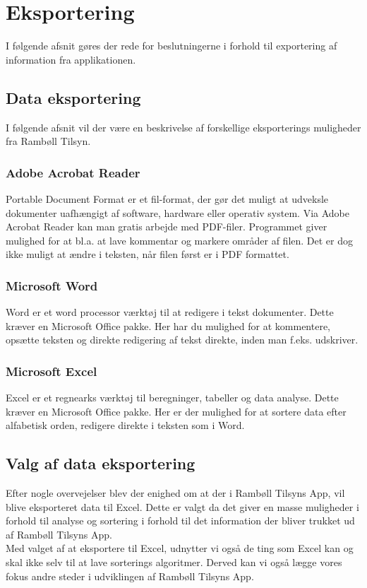 \section{Eksportering}                                   
I følgende afsnit gøres der rede for beslutningerne i forhold til exportering af information fra applikationen.

\subsection{Data eksportering}
I følgende afsnit vil der være en beskrivelse af forskellige eksporterings muligheder fra Rambøll Tilsyn.

\subsubsection{Adobe Acrobat Reader}
Portable Document Format\cite{PDF} er et fil-format, der gør det muligt at udveksle dokumenter uafhængigt af software, hardware eller operativ system.
Via Adobe Acrobat Reader\cite{AdobeReader} kan man gratis arbejde med PDF-filer. Programmet giver mulighed for at bl.a. at lave kommentar og markere områder af filen. Det er dog ikke muligt at ændre i teksten, når filen først er i PDF formattet.

\subsubsection{Microsoft Word}
Word\cite{Office} er et word processor\cite{WordProcessor} værktøj til at redigere i tekst dokumenter.
Dette kræver en Microsoft Office pakke. Her har du mulighed for at kommentere, opsætte teksten og direkte redigering af tekst direkte, inden man f.eks. udskriver.

\subsubsection{Microsoft Excel}
Excel\cite{Office} er et regnearks værktøj til beregninger, tabeller og data analyse. 
Dette kræver en Microsoft Office pakke. Her er der mulighed for at sortere data efter alfabetisk orden, redigere direkte i teksten som i Word.

\subsection{Valg af data eksportering}
Efter nogle overvejelser blev der enighed om at der i Rambøll Tilsyns App, vil blive eksporteret data til Excel. Dette er valgt da det giver en masse muligheder i forhold til analyse og sortering i forhold til det information der bliver trukket ud af Rambøll Tilsyns App. \\
Med valget af at eksportere til Excel, udnytter vi også de ting som Excel kan og skal ikke selv til at lave sorterings algoritmer. Derved kan vi også lægge vores fokus andre steder i udviklingen af Rambøll Tilsyns App.